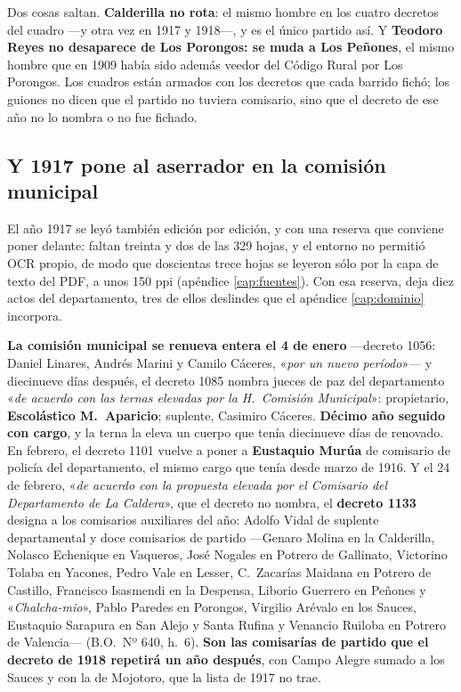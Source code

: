 Dos cosas saltan. \textbf{Calderilla no rota}: el mismo hombre en los cuatro decretos del cuadro ---y otra vez en 1917 y 1918---, y es el único
partido así. Y \textbf{Teodoro Reyes no desaparece de Los Porongos: se muda a Los Peñones}, el mismo
hombre que en 1909 había sido además veedor del Código Rural por Los Porongos. Los cuadros están
armados con los decretos que cada barrido fichó; los guiones no dicen que el partido no tuviera
comisario, sino que el decreto de ese año no lo nombra o no fue fichado.

\subsection*{Y 1917 pone al aserrador en la comisión municipal}

El año 1917 se leyó también edición por edición, y con una reserva que conviene poner delante: faltan
treinta y dos de las 329 hojas, y el entorno no permitió OCR propio, de modo que
doscientas trece hojas se leyeron sólo por la capa de texto del PDF, a unos 150 ppi (apéndice
\ref{cap:fuentes}). Con esa reserva, deja diez actos del departamento, tres de ellos deslindes que el
apéndice \ref{cap:dominio} incorpora.

\textbf{La comisión municipal se renueva entera el 4 de enero} ---decreto 1056: Daniel
Linares, Andrés Marini y Camilo Cáceres, «\textit{por un nuevo período}»--- y
diecinueve días después, el decreto 1085 nombra jueces de paz del departamento «\textit{de acuerdo con
las ternas elevadas por la H.\ Comisión Municipal}»: propietario, \textbf{Escolástico M.\
Aparicio}; suplente, Casimiro Cáceres. \textbf{Décimo año seguido con
cargo}, y la terna la eleva un cuerpo que tenía diecinueve días de renovado. En febrero, el decreto
1101 vuelve a poner a \textbf{Eustaquio Murúa}\index{Murúa, Eustaquio} de comisario de policía del
departamento, el mismo cargo que tenía desde marzo de 1916. Y el 24 de febrero, «\textit{de acuerdo con
la propuesta elevada por el Comisario del Departamento de La Caldera}», que el decreto no nombra, el
\textbf{decreto 1133} designa a los comisarios auxiliares del año: Adolfo Vidal de suplente
departamental y doce comisarios de partido ---Genaro Molina en la Calderilla, Nolasco Echenique en
Vaqueros, José Nogales en Potrero de Gallinato, Victorino Tolaba en Yacones, Pedro Vale en Lesser,
C.\ Zacarías Maidana en Potrero de Castillo, Francisco Isasmendi en la Despensa, Liborio
Guerrero\index{Guerrero, Liborio} en Peñones y «\textit{Chalcha-mio}», Pablo Paredes en Porongos,
Virgilio Arévalo en los Sauces, Eustaquio Sarapura en San Alejo y Santa Rufina y Venancio Ruiloba en
Potrero de Valencia--- (B.O.\ Nº 640, h.\ 6). \textbf{Son las comisarías de partido que el decreto de
1918 repetirá un año después}, con Campo Alegre sumado a los Sauces y con la de Mojotoro, que la lista de 1917 no trae.

